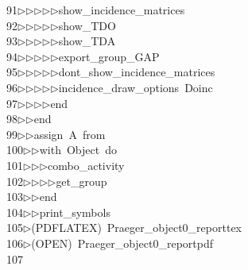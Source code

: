 \begin{tabbing}
91\>$\triangleright$\>$\triangleright$\>$\triangleright$\>$\triangleright$\>$\triangleright$\>show\_incidence\_matrices\ \\[0pt]
92\>$\triangleright$\>$\triangleright$\>$\triangleright$\>$\triangleright$\>$\triangleright$\>show\_TDO\ \\[0pt]
93\>$\triangleright$\>$\triangleright$\>$\triangleright$\>$\triangleright$\>$\triangleright$\>show\_TDA\ \\[0pt]
94\>$\triangleright$\>$\triangleright$\>$\triangleright$\>$\triangleright$\>$\triangleright$\>export\_group\_GAP\ \\[0pt]
95\>$\triangleright$\>$\triangleright$\>$\triangleright$\>$\triangleright$\>$\triangleright$\>dont\_show\_incidence\_matrices\ \\[0pt]
96\>$\triangleright$\>$\triangleright$\>$\triangleright$\>$\triangleright$\>$\triangleright$\>incidence\_draw\_options\ Doinc\ \\[0pt]
97\>$\triangleright$\>$\triangleright$\>$\triangleright$\>$\triangleright$\>end\ \\[0pt]
98\>$\triangleright$\>$\triangleright$\>end\ \\[0pt]
99\>$\triangleright$\>$\triangleright$\>assign\ A\ from\ \\[0pt]
100\>$\triangleright$\>$\triangleright$\>with\ Object\ do\ \\[0pt]
101\>$\triangleright$\>$\triangleright$\>$\triangleright$\>combo\_activity\ \\[0pt]
102\>$\triangleright$\>$\triangleright$\>$\triangleright$\>$\triangleright$\>get\_group\ \\[0pt]
103\>$\triangleright$\>$\triangleright$\>end\ \\[0pt]
104\>$\triangleright$\>$\triangleright$\>print\_symbols\\[0pt]
105\>$\triangleright$\>(PDFLATEX)\ Praeger\_object0\_reporttex\\[0pt]
106\>$\triangleright$\>(OPEN)\ Praeger\_object0\_reportpdf\\[0pt]
107\>\end{tabbing}
